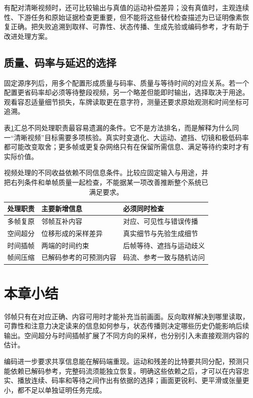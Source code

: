 有配对清晰视频时，还可比较输出与真值的运动补偿差异；没有真值时，主观连续性、下游任务和原始证据检查更重要，但不能将这些替代检查描述为已证明像素恢复正确。把失败追溯到取样、可靠性、状态传播、生成先验或编码参考，才有助于改进处理方案。

\subsection{质量、码率与延迟的选择}
\label{sec:vision-video-quality-rate-latency}

固定源序列后，用多个配置形成质量与码率、质量与等待时间的对应关系。若一个配置更省码率却必须等待整段视频，另一个略差但能即时输出，选择取决于用途。观看容忍适量细节损失，车牌读取更在意字符，测量还要求原始观测和时间坐标可追溯。

表\ref{tab:vision-video-tradeoff}汇总不同处理职责最容易遗漏的条件。它不是方法排名，而是解释为什么同一“清晰视频”目标需要多项核验。真实时变退化、大运动、遮挡、切镜和极低码率都可能改变取舍；更多帧或更复杂网络只有在保留所需信息、满足等待约束时才有实际价值。
\begin{table}[htbp]
  \centering
  \begin{tabularx}{\linewidth}{@{}lXX@{}}
    \toprule
    处理职责 & 主要新增信息 & 必须同时检查\\
    \midrule
    多帧复原 & 邻帧互补内容 & 对应、可见性与错误传播\\
    空间超分 & 位移形成的采样差异 & 真实细节与先验生成细节\\
    时间插帧 & 两端的时间约束 & 后帧等待、遮挡与运动歧义\\
    帧间压缩 & 已解码参考的可预测内容 & 码流、参考一致与随机访问\\
    \bottomrule
  \end{tabularx}
  \caption{视频处理的不同收益依赖不同信息条件。比较应固定输入与用途，并把右列条件和单帧质量一起检查，不能据某一项改善推断整个系统已满足要求。}
  \label{tab:vision-video-tradeoff}
\end{table}
\FloatBarrier

\section{本章小结}
\label{sec:vision-video-restoration-summary}

邻帧只有在对应正确、内容可用时才能补充当前画面。反向取样解决到哪里读取，可靠性和注意力决定读来的信息如何参与，状态传播则决定哪些历史仍能影响后续输出。空间超分与时间插帧扩展了不同方向的采样，也分别引入未直接观测内容的估计。

编码进一步要求共享信息能在解码端重现。运动和残差的比特要共同分配，预测只能依赖已解码参考，完整码流须能独立恢复。明确这些依赖之后，才可以在内容忠实、播放连续、码率和等待之间作出有依据的选择；画面更锐利、更平滑或张量更小，都不足以单独证明任务完成。
